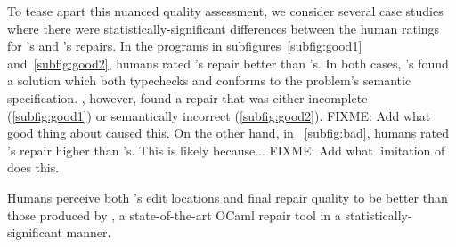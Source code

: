 To tease apart this nuanced quality assessment, we consider several case studies where
there were statistically-significant differences between the human ratings for 
\toolname's and \seminal's repairs. In the programs in subfigures~\ref{subfig:good1} 
and~\ref{subfig:good2}, humans rated \toolname's repair better than \seminal's. 
In both cases, \toolname's found a solution which both typechecks and 
conforms to the problem's semantic specification. \seminal, however, found a 
repair that was either incomplete (\ref{subfig:good1}) or semantically incorrect
(\ref{subfig:good2}). FIXME: Add what good thing about \toolname caused this. 
On the other hand, in ~\ref{subfig:bad}, humans rated \seminal's repair higher 
than \toolname's. This is likely because... FIXME: Add what limitation of \toolname
does this.
\vspace{3mm}
\begin{framed}
\noindent Humans perceive both \toolname's edit locations and final
 repair quality to be better than those produced by \seminal, a state-of-the-art 
  OCaml repair tool in a statistically-significant manner.
\end{framed}






